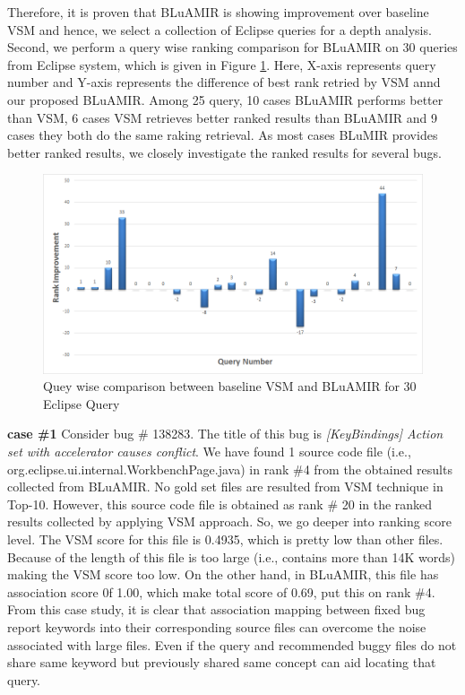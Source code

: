 \documentclass[conference]{IEEEtran}
\begin{document}
Therefore, it is proven that BLuAMIR is showing improvement over baseline VSM and hence, we select a collection of Eclipse queries for a depth analysis.
Second, we perform a query wise ranking comparison for BLuAMIR on 30 queries from Eclipse system, which is given in Figure \ref{fig:RankImprovement}. Here, X-axis represents query number and Y-axis represents the difference of best rank retried by VSM annd our proposed BLuAMIR. Among 25 query, 10 cases BLuAMIR performs better than VSM, 6 cases VSM retrieves better ranked results than BLuAMIR and 9 cases they both do the same raking retrieval. As most cases BLuMIR provides better ranked results, we closely investigate the ranked results for several bugs. 
\begin{figure}
	\centering
	\includegraphics[scale=0.45]{RankImprovement}
	\caption{Quey wise comparison between baseline VSM and BLuAMIR for 30 Eclipse Query}
	\label{fig:RankImprovement}
\end{figure}

\textbf{case \#1} Consider bug \# 138283. The title of this bug is \textit{[KeyBindings] Action set with accelerator causes conflict}. We have found 1 source code file (i.e., org.eclipse.ui.internal.WorkbenchPage.java) in rank \#4 from the obtained results collected from BLuAMIR. No gold set files are resulted from VSM technique in Top-10. However, this source code file is obtained as rank \# 20 in the ranked results collected by applying VSM approach. So, we go deeper into ranking score level. The VSM score for this file is 0.4935, which is pretty low than other files. Because of the length of this file is too large (i.e., contains more than 14K words) making the VSM score too low. On the other hand, in BLuAMIR, this file has association score 0f 1.00, which make total score of 0.69, put this on rank \#4. From this case study, it is clear that association mapping between fixed bug report keywords into their corresponding source files can overcome the noise associated with large files. Even if the query and recommended buggy files do not share same keyword but previously shared same concept can aid locating that query. 
\end{document}
